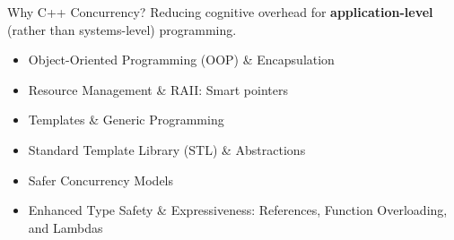 \begin{frame}[fragile]{ Why C++ Concurrency?}
	Reducing cognitive overhead for \textbf{application-level} (rather than systems-level) programming.
	\begin{itemize}
		\item Object-Oriented Programming (OOP) \& Encapsulation
		\item Resource Management \& RAII: Smart pointers
		\item Templates \& Generic Programming
		\item Standard Template Library (STL) \& Abstractions
		\item Safer Concurrency Models
		\item Enhanced Type Safety \& Expressiveness: References, Function Overloading, and Lambdas
	\end{itemize}
\end{frame}

